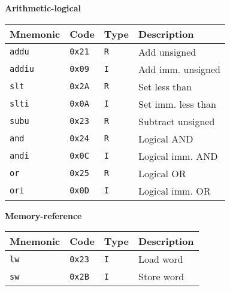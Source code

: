 \documentclass[11pt,twoside,a4paper]{article}
\begin{document}
\begin{figure}[H]
        \begin{multicols}{2}
        \center

        \textbf{Arithmetic-logical} \\
        \vspace{0.15in}
        \begin{tabular}{|l|l|l|l|}
                \hline
                \scriptsize {\bf Mnemonic} &
                \scriptsize {\bf Code} &
                \scriptsize {\bf Type} &
                \scriptsize {\bf Description} \\
                \hline {\tt addu} & {\tt 0x21} & {\tt R} &
				\scriptsize Add unsigned \\
                \hline {\tt addiu} & {\tt 0x09} & {\tt I} &
				\scriptsize Add imm. unsigned \\
                \hline {\tt slt} & {\tt 0x2A} & {\tt R} &
				\scriptsize Set less than \\
                \hline {\tt slti} & {\tt 0x0A} & {\tt I} &
				\scriptsize Set imm. less than \\
                \hline {\tt subu} & {\tt 0x23} & {\tt R} &
				\scriptsize Subtract unsigned \\
                \hline {\tt and} & {\tt 0x24} & {\tt R} &
				\scriptsize Logical AND \\
                \hline {\tt andi} & {\tt 0x0C} & {\tt I} &
				\scriptsize Logical imm. AND \\
                \hline {\tt or} & {\tt 0x25} & {\tt R} &
				\scriptsize Logical OR \\
                \hline {\tt ori} & {\tt 0x0D} & {\tt I} &
				\scriptsize Logical imm. OR \\
                \hline
        \end{tabular}
        
        \columnbreak
        \center

        \textbf{Memory-reference} \\
        \vspace{0.15in}
        \begin{tabular}{|l|l|l|l|}
                \hline
                \scriptsize {\bf Mnemonic} &
                \scriptsize {\bf Code} &
                \scriptsize {\bf Type} &
                \scriptsize {\bf Description} \\
                \hline {\tt lw} & {\tt 0x23} & {\tt I} &
				\scriptsize Load word \\
                \hline {\tt sw} & {\tt 0x2B} & {\tt I} &
				\scriptsize Store word \\
                \hline
        \end{tabular}


\end{multicols}
\end{figure}
\end{document}
